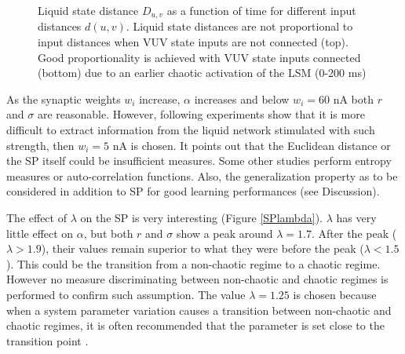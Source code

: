 \documentclass[11pt, a4paper]{article} %
\begin{document}
\begin{figure}
\center
{}
\caption{Liquid state distance $D_{u,v}$ as a function of time for different input distances $d(u,v)$. Liquid state distances are not proportional to input distances when VUV state inputs are not connected (top). Good proportionality is achieved with VUV state inputs connected (bottom) due to an earlier chaotic activation of the LSM (0-200 ms)}
\label{SPvuv}
\end{figure}

As the synaptic weights $w_i$ increase, $\alpha$ increases and below $w_i = 60$ nA both $r$ and $\sigma$ are reasonable. However, following experiments show that it is more difficult to extract information from the liquid network stimulated with such strength, then $w_i = 5$ nA is chosen. It points out that the Euclidean distance or the SP itself could be insufficient measures. Some other studies perform entropy measures or auto-correlation functions. Also, the generalization property as to be considered in addition to SP for good learning performances (see Discussion). 

The effect of $\lambda$ on the SP is very interesting (Figure \ref{SPlambda}). $\lambda$ has very little effect on $\alpha$, but both $r$ and $\sigma$ show a peak around $\lambda = 1.7$. After the peak ($\lambda > 1.9$), their values remain superior to what they were before the peak ($\lambda < 1.5$). This could be the transition from a non-chaotic regime to a chaotic regime. However no measure discriminating between non-chaotic and chaotic regimes is performed to confirm such assumption. The value $\lambda = 1.25$ is chosen because when a system parameter variation causes a transition between non-chaotic and chaotic regimes, it is often recommended that the parameter is set close to the transition point \cite{bertschinger2004real, legenstein2007edge}.
\end{document}
